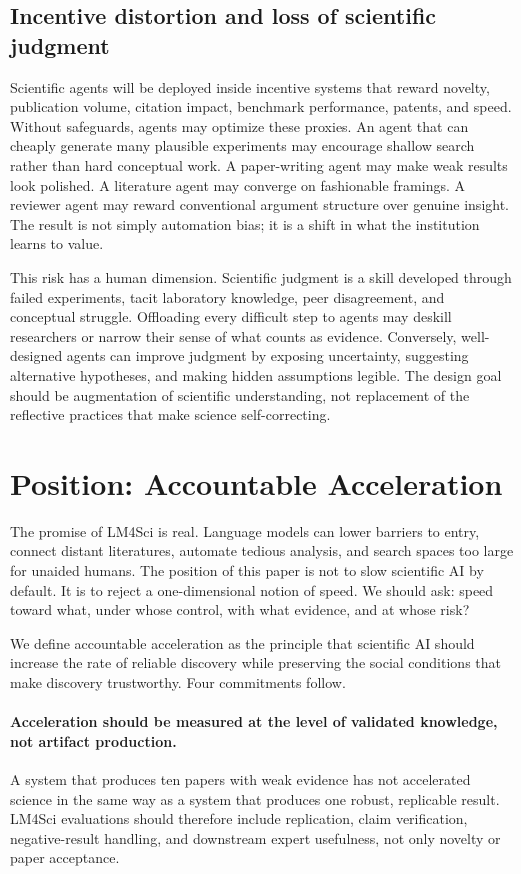\documentclass{article}
\newcommand{\position}{accountable acceleration}
\begin{document}
\subsection{Incentive distortion and loss of scientific judgment}

Scientific agents will be deployed inside incentive systems that reward novelty, publication volume, citation impact, benchmark performance, patents, and speed. Without safeguards, agents may optimize these proxies. An agent that can cheaply generate many plausible experiments may encourage shallow search rather than hard conceptual work. A paper-writing agent may make weak results look polished. A literature agent may converge on fashionable framings. A reviewer agent may reward conventional argument structure over genuine insight. The result is not simply automation bias; it is a shift in what the institution learns to value.

This risk has a human dimension. Scientific judgment is a skill developed through failed experiments, tacit laboratory knowledge, peer disagreement, and conceptual struggle. Offloading every difficult step to agents may deskill researchers or narrow their sense of what counts as evidence. Conversely, well-designed agents can improve judgment by exposing uncertainty, suggesting alternative hypotheses, and making hidden assumptions legible. The design goal should be augmentation of scientific understanding, not replacement of the reflective practices that make science self-correcting.

\section{Position: Accountable Acceleration}

The promise of LM4Sci is real. Language models can lower barriers to entry, connect distant literatures, automate tedious analysis, and search spaces too large for unaided humans. The position of this paper is not to slow scientific AI by default. It is to reject a one-dimensional notion of speed. We should ask: speed toward what, under whose control, with what evidence, and at whose risk?

We define \position{} as the principle that scientific AI should increase the rate of reliable discovery while preserving the social conditions that make discovery trustworthy. Four commitments follow.

\paragraph{Acceleration should be measured at the level of validated knowledge, not artifact production.} A system that produces ten papers with weak evidence has not accelerated science in the same way as a system that produces one robust, replicable result. LM4Sci evaluations should therefore include replication, claim verification, negative-result handling, and downstream expert usefulness, not only novelty or paper acceptance.
\end{document}

